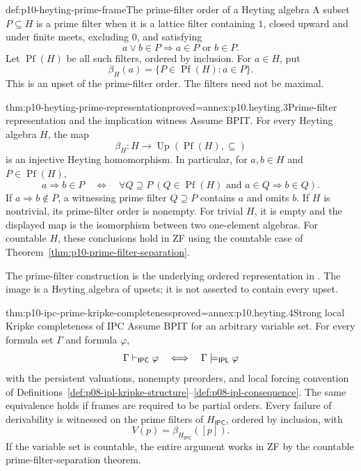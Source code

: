 \begin{hbdefinition}{def:p10-heyting-prime-frame}{The prime-filter order of a Heyting algebra}
A subset \(P\subseteq H\) is a prime filter when it is a lattice filter containing \(1\),
closed upward and under finite meets, excluding \(0\), and
satisfying
\[
 a\vee b\in P\Longrightarrow a\in P\text{ or }b\in P.
\]
Let \(\operatorname{Pf}(H)\) be all such filters, ordered by inclusion.
For \(a\in H\), put
\[
 \beta_H(a)=\{P\in\operatorname{Pf}(H):a\in P\}.
\]
This is an upset of the prime-filter order.
The filters need not be maximal.
\end{hbdefinition}

\begin{hbtheorem}{thm:p10-heyting-prime-representation}{proved=annex:p10.heyting.3}{Prime-filter representation and the implication witness}
Assume BPIT.  For every Heyting algebra \(H\), the map
\[
 \beta_H:H\longrightarrow
       \operatorname{Up}(\operatorname{Pf}(H),\subseteq)
\]
is an injective Heyting homomorphism.
In particular, for \(a,b\in H\) and \(P\in\operatorname{Pf}(H)\),
\[
 a\Rightarrow b\in P
 \quad\Longleftrightarrow\quad
 \forall Q\supseteq P\
       (Q\in\operatorname{Pf}(H)\text{ and }a\in Q
                     \Longrightarrow b\in Q).
\]
If \(a\Rightarrow b\notin P\), a witnessing prime filter
\(Q\supseteq P\) contains \(a\) and omits \(b\).
If \(H\) is nontrivial, its prime-filter order is nonempty.
For trivial \(H\), it is empty and the displayed map is the
isomorphism between two one-element algebras.
For countable \(H\), these conclusions hold in ZF using the
countable case of Theorem~\ref{thm:p10-prime-filter-separation}.
\end{hbtheorem}

The prime-filter construction is the underlying ordered
representation in
\cite[Theorem~2.3.3 and its proof sketch, p.~28]{Bezhanishvili2006Thesis}.
The image is a Heyting algebra of upsets; it is not asserted
to contain every upset.

\begin{hbtheorem}{thm:p10-ipc-prime-kripke-completeness}{proved=annex:p10.heyting.4}{Strong local Kripke completeness of IPC}
Assume BPIT for an arbitrary variable set.
For every formula set \(\Gamma\) and formula \(\varphi\),
\[
 \Gamma\vdash_{\mathsf{IPC}}\varphi
       \quad\Longleftrightarrow\quad
 \Gamma\models_{\mathsf{IPL}}\varphi
\]
with the persistent valuations, nonempty preorders, and local
forcing convention of
Definitions~\ref{def:p08-ipl-kripke-structure}--\ref{def:p08-ipl-consequence}.
The same equivalence holds if frames are required to be partial orders.
Every failure of derivability is witnessed on the prime filters
of \(H_{\mathsf{IPC}}\), ordered by inclusion, with
\[
 V(p)=\beta_{H_{\mathsf{IPC}}}([p]).
\]
If the variable set is countable, the entire argument works in
ZF by the countable prime-filter-separation theorem.
\end{hbtheorem}
